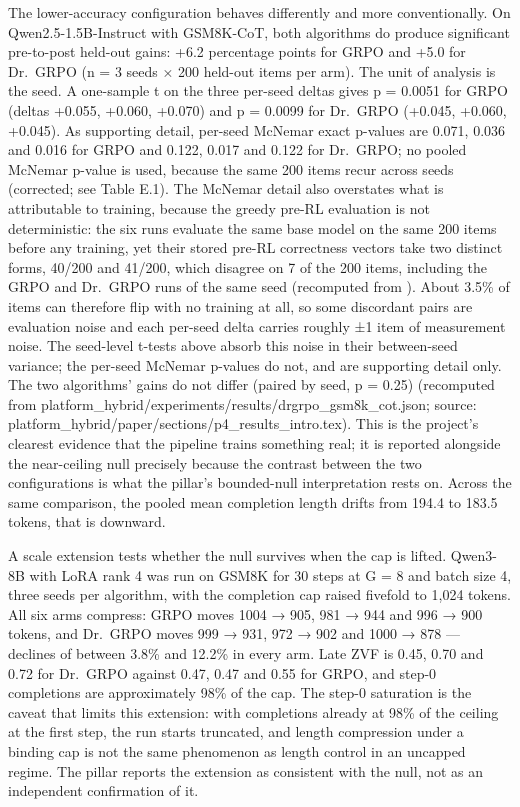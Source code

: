 \documentclass[12pt,a4paper]{report}
\DeclareRobustCommand{\longtok}[1]{\texttt{\seqsplit{#1}}}
\begin{document}
The lower-accuracy configuration behaves differently and more
conventionally. On Qwen2.5-1.5B-Instruct with GSM8K-CoT, both algorithms
do produce significant pre-to-post held-out gains: +6.2 percentage
points for GRPO and +5.0 for Dr.~GRPO (n = 3 seeds × 200 held-out items
per arm). The unit of analysis is the seed. A one-sample t on the three
per-seed deltas gives p = 0.0051 for GRPO (deltas +0.055, +0.060,
+0.070) and p = 0.0099 for Dr.~GRPO (+0.045, +0.060, +0.045). As
supporting detail, per-seed McNemar exact p-values are 0.071, 0.036 and
0.016 for GRPO and 0.122, 0.017 and 0.122 for Dr.~GRPO; no pooled
McNemar p-value is used, because the same 200 items recur across seeds
(corrected; see Table E.1). The McNemar detail also overstates what is
attributable to training, because the greedy pre-RL evaluation is not
deterministic: the six runs evaluate the same base model on the same 200
items before any training, yet their stored pre-RL correctness vectors
take two distinct forms, 40/200 and 41/200, which disagree on 7 of the
200 items, including the GRPO and Dr.~GRPO runs of the same seed
(recomputed from
\longtok{platform\_hybrid/experiments/results/drgrpo\_\allowbreak{}gsm8k\_\allowbreak{}cot\_\allowbreak{}full.json}).
About 3.5\% of items can therefore flip with no training at all, so some
discordant pairs are evaluation noise and each per-seed delta carries
roughly ±1 item of measurement noise. The seed-level t-tests above
absorb this noise in their between-seed variance; the per-seed McNemar
p-values do not, and are supporting detail only. The two algorithms'
gains do not differ (paired by seed, p = 0.25) (recomputed from
platform\_hybrid/experiments/results/drgrpo\_\allowbreak{}gsm8k\_\allowbreak{}cot.json; source:
platform\_hybrid/paper/sections/p4\_\allowbreak{}results\_\allowbreak{}intro.tex). This is the
project's clearest evidence that the pipeline trains something real; it
is reported alongside the near-ceiling null precisely because the
contrast between the two configurations is what the pillar's
bounded-null interpretation rests on. Across the same comparison, the
pooled mean completion length drifts from 194.4 to 183.5 tokens, that is
downward.

A scale extension tests whether the null survives when the cap is
lifted. Qwen3-8B with LoRA rank 4 was run on GSM8K for 30 steps at G = 8
and batch size 4, three seeds per algorithm, with the completion cap
raised fivefold to 1,024 tokens. All six arms compress: GRPO moves 1004
→ 905, 981 → 944 and 996 → 900 tokens, and Dr.~GRPO moves 999 → 931, 972
→ 902 and 1000 → 878 --- declines of between 3.8\% and 12.2\% in every
arm. Late ZVF is 0.45, 0.70 and 0.72 for Dr.~GRPO against 0.47, 0.47 and
0.55 for GRPO, and step-0 completions are approximately 98\% of the cap.
The step-0 saturation is the caveat that limits this extension: with
completions already at 98\% of the ceiling at the first step, the run
starts truncated, and length compression under a binding cap is not the
same phenomenon as length control in an uncapped regime. The pillar
reports the extension as consistent with the null, not as an independent
confirmation of it.
\end{document}
